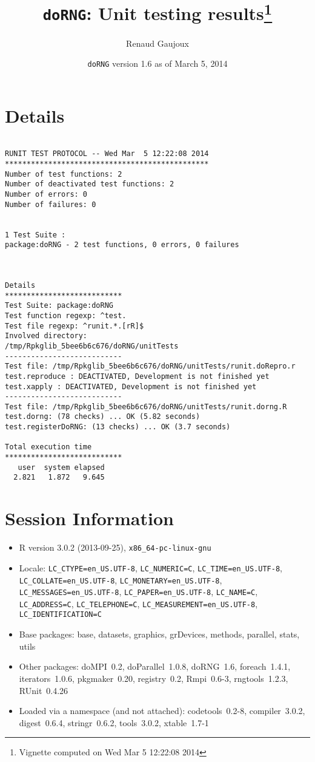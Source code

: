 \documentclass[10pt]{article}\usepackage[]{graphicx}\usepackage[]{color}
\author{Renaud Gaujoux}
\title{\texttt{doRNG}: Unit testing results\footnote{Vignette computed  on Wed Mar  5 12:22:08 2014}}
\date{\texttt{doRNG} version 1.6 as of March  5, 2014}
\begin{document}
\maketitle

\section{Details}
\begin{verbatim}

RUNIT TEST PROTOCOL -- Wed Mar  5 12:22:08 2014 
*********************************************** 
Number of test functions: 2 
Number of deactivated test functions: 2 
Number of errors: 0 
Number of failures: 0 

 
1 Test Suite : 
package:doRNG - 2 test functions, 0 errors, 0 failures



Details 
*************************** 
Test Suite: package:doRNG 
Test function regexp: ^test. 
Test file regexp: ^runit.*.[rR]$ 
Involved directory: 
/tmp/Rpkglib_5bee6b6c676/doRNG/unitTests 
--------------------------- 
Test file: /tmp/Rpkglib_5bee6b6c676/doRNG/unitTests/runit.doRepro.r 
test.reproduce : DEACTIVATED, Development is not finished yet
test.xapply : DEACTIVATED, Development is not finished yet
--------------------------- 
Test file: /tmp/Rpkglib_5bee6b6c676/doRNG/unitTests/runit.dorng.R 
test.dorng: (78 checks) ... OK (5.82 seconds)
test.registerDoRNG: (13 checks) ... OK (3.7 seconds)

Total execution time
***************************
   user  system elapsed 
  2.821   1.872   9.645 

\end{verbatim}

\section*{Session Information}
\begin{itemize}\raggedright
  \item R version 3.0.2 (2013-09-25), \verb|x86_64-pc-linux-gnu|
  \item Locale: \verb|LC_CTYPE=en_US.UTF-8|, \verb|LC_NUMERIC=C|, \verb|LC_TIME=en_US.UTF-8|, \verb|LC_COLLATE=en_US.UTF-8|, \verb|LC_MONETARY=en_US.UTF-8|, \verb|LC_MESSAGES=en_US.UTF-8|, \verb|LC_PAPER=en_US.UTF-8|, \verb|LC_NAME=C|, \verb|LC_ADDRESS=C|, \verb|LC_TELEPHONE=C|, \verb|LC_MEASUREMENT=en_US.UTF-8|, \verb|LC_IDENTIFICATION=C|
  \item Base packages: base, datasets, graphics, grDevices, methods,
    parallel, stats, utils
  \item Other packages: doMPI~0.2, doParallel~1.0.8, doRNG~1.6,
    foreach~1.4.1, iterators~1.0.6, pkgmaker~0.20, registry~0.2,
    Rmpi~0.6-3, rngtools~1.2.3, RUnit~0.4.26
  \item Loaded via a namespace (and not attached): codetools~0.2-8,
    compiler~3.0.2, digest~0.6.4, stringr~0.6.2, tools~3.0.2,
    xtable~1.7-1
\end{itemize}
\end{document}
